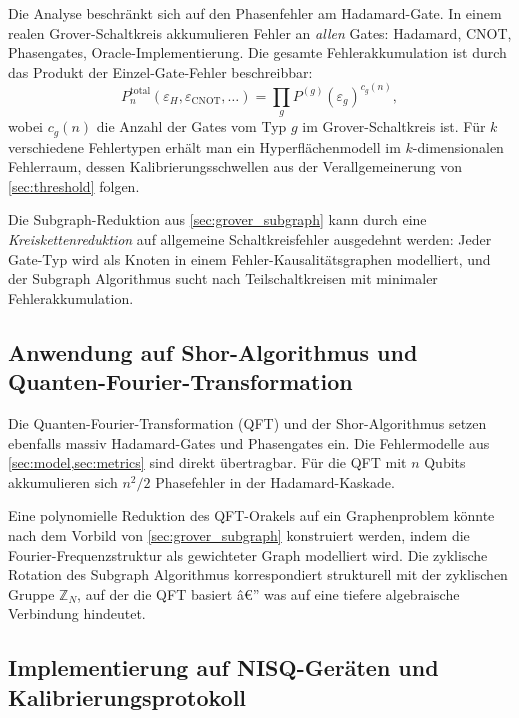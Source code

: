 ﻿\documentclass[11pt,a4paper]{article}
\theoremstyle{definition}
\begin{document}
Die Analyse beschränkt sich auf den Phasenfehler am Hadamard-Gate.  In einem
realen Grover-Schaltkreis akkumulieren Fehler an \emph{allen} Gates:
Hadamard, CNOT, Phasengates, Oracle-Implementierung.  Die gesamte
Fehlerakkumulation ist durch das Produkt der Einzel-Gate-Fehler beschreibbar:
\begin{equation}
  P_n^{\mathrm{total}}(\varepsilon_H, \varepsilon_{\mathrm{CNOT}}, \ldots)
  = \prod_{g} P^{(g)}(\varepsilon_g)^{c_g(n)},
\end{equation}
wobei $c_g(n)$ die Anzahl der Gates vom Typ $g$ im Grover-Schaltkreis ist.
Für $k$ verschiedene Fehlertypen erhält man ein Hyperflächenmodell im
$k$-dimensionalen Fehlerraum, dessen Kalibrierungsschwellen aus der
Verallgemeinerung von \cref{sec:threshold} folgen.

Die Subgraph-Reduktion aus \cref{sec:grover_subgraph} kann durch eine
\emph{Kreiskettenreduktion} auf allgemeine Schaltkreisfehler ausgedehnt werden:
Jeder Gate-Typ wird als Knoten in einem Fehler-Kausalitätsgraphen modelliert,
und der Subgraph Algorithmus sucht nach Teilschaltkreisen mit minimaler
Fehlerakkumulation.

\subsection{Anwendung auf Shor-Algorithmus und Quanten-Fourier-Transformation}
\label{subsec:outlook_shor}

Die Quanten-Fourier-Transformation (QFT) \cite{Coppersmith1994} und der
Shor-Algorithmus \cite{Shor1994} setzen ebenfalls massiv Hadamard-Gates
und Phasengates ein.  Die Fehlermodelle aus \cref{sec:model,sec:metrics}
sind direkt übertragbar.  Für die QFT mit $n$ Qubits akkumulieren sich
$n^2/2$ Phasefehler in der Hadamard-Kaskade.

Eine polynomielle Reduktion des QFT-Orakels auf ein Graphenproblem könnte
nach dem Vorbild von \cref{sec:grover_subgraph} konstruiert werden,
indem die Fourier-Frequenzstruktur als gewichteter Graph modelliert wird.
Die zyklische Rotation des Subgraph Algorithmus \cite{Epp2026} korrespondiert
strukturell mit der zyklischen Gruppe $\mathbb{Z}_N$, auf der die QFT basiert â€”
was auf eine tiefere algebraische Verbindung hindeutet.

\subsection{Implementierung auf NISQ-Geräten und Kalibrierungsprotokoll}
\label{subsec:outlook_nisq}
\end{document}
